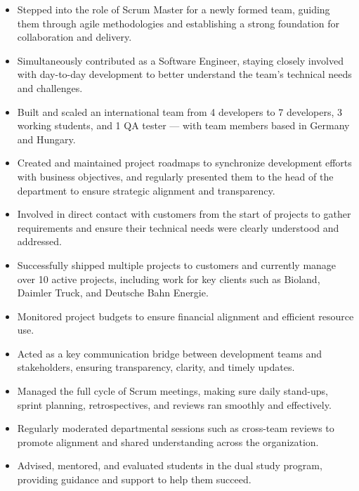 \documentclass[10pt, a4paper]{cvhari}
\begin{document}
    \begin{itemize}
        \item Stepped into the role of Scrum Master for a newly formed team, guiding them through agile methodologies and establishing a strong foundation for collaboration and delivery.

        \item Simultaneously contributed as a Software Engineer, staying closely involved with day-to-day development to better understand the team’s technical needs and challenges.

        \item Built and scaled an international team from 4 developers to 7 developers, 3 working students, and 1 QA tester — with team members based in Germany and Hungary.

        \item Created and maintained project roadmaps to synchronize development efforts with business objectives, and regularly presented them to the head of the department to ensure strategic alignment and transparency.

        \item Involved in direct contact with customers from the start of projects to gather requirements and ensure their technical needs were clearly understood and addressed.

        \item Successfully shipped multiple projects to customers and currently manage over 10 active projects, including work for key clients such as Bioland, Daimler Truck, and Deutsche Bahn Energie.

        \item Monitored project budgets to ensure financial alignment and efficient resource use.

        \item Acted as a key communication bridge between development teams and stakeholders, ensuring transparency, clarity, and timely updates.

        \item Managed the full cycle of Scrum meetings, making sure daily stand-ups, sprint planning, retrospectives, and reviews ran smoothly and effectively.

        \item Regularly moderated departmental sessions such as cross-team reviews to promote alignment and shared understanding across the organization.

        \item Advised, mentored, and evaluated students in the dual study program, providing guidance and support to help them succeed.
        
    \end{itemize}
\end{document}
